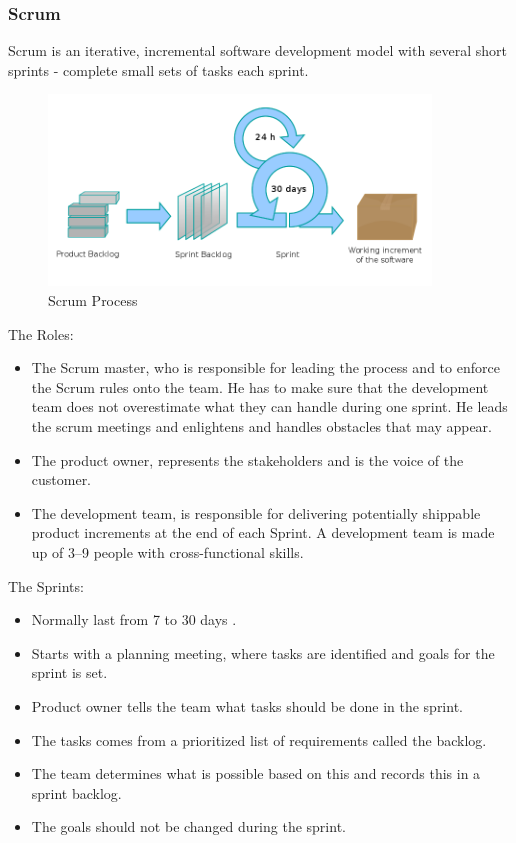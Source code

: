 \subsubsection{Scrum}
Scrum is an iterative, incremental software development model with several short sprints - complete small sets of tasks each sprint.

\begin{figure}
\centering
\includegraphics[width=4in]{image/Scrum_process.png}
\caption{Scrum Process}
\label{figure:scrumprocess}
\end{figure}


The Roles: 
\begin{itemize}

\item The Scrum master, who is responsible for leading the process and to enforce the Scrum rules onto the team. He has to make sure that the development team does not overestimate what they can handle during one sprint. He leads the scrum meetings and enlightens and handles obstacles that may appear. 

\item The product owner, represents the stakeholders and is the voice of the customer.

\item The development team, is responsible for delivering potentially shippable product increments at the end of each Sprint. A development team is made up of 3–9 people with cross-functional skills.

\end{itemize}

The Sprints:
\begin{itemize}

\item Normally last from 7 to 30 days .
\item Starts with a planning meeting, where tasks are identified and goals for the sprint is set.
\item Product owner tells the team what tasks should be done in the sprint.
\item The tasks comes from a prioritized list of requirements called the backlog.
\item The team determines what is possible based on this and records this in a sprint backlog.
\item The goals should not be changed during the sprint.

\end{itemize}

